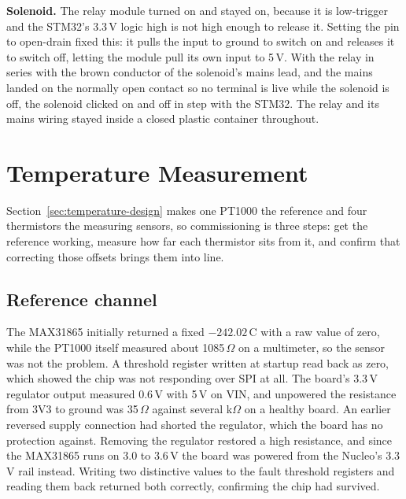 \textbf{Solenoid.} The relay module turned on and stayed on, because it is low-trigger and the STM32's 3.3\,V logic high is not high enough to release it. Setting the pin to open-drain fixed this: it pulls the input to ground to switch on and releases it to switch off, letting the module pull its own input to 5\,V. With the relay in series with the brown conductor of the solenoid's mains lead, and the mains landed on the normally open contact so no terminal is live while the solenoid is off, the solenoid clicked on and off in step with the STM32. The relay and its mains wiring stayed inside a closed plastic container throughout.

\section{Temperature Measurement}
\label{sec:temperature-commissioning}

Section~\ref{sec:temperature-design} makes one PT1000 the reference and four thermistors the measuring sensors, so commissioning is three steps: get the reference working, measure how far each thermistor sits from it, and confirm that correcting those offsets brings them into line.

\subsection{Reference channel}
\label{subsec:pt1000-commissioning}

The MAX31865 initially returned a fixed $-242.02$\,\textdegree{}C with a raw value of zero, while the PT1000 itself measured about 1085\,$\Omega$ on a multimeter, so the sensor was not the problem. A threshold register written at startup read back as zero, which showed the chip was not responding over SPI at all. The board's 3.3\,V regulator output measured 0.6\,V with 5\,V on VIN, and unpowered the resistance from 3V3 to ground was 35\,$\Omega$ against several k$\Omega$ on a healthy board. An earlier reversed supply connection had shorted the regulator, which the board has no protection against. Removing the regulator restored a high resistance, and since the MAX31865 runs on 3.0 to 3.6\,V the board was powered from the Nucleo's 3.3\,V rail instead. Writing two distinctive values to the fault threshold registers and reading them back returned both correctly, confirming the chip had survived.

